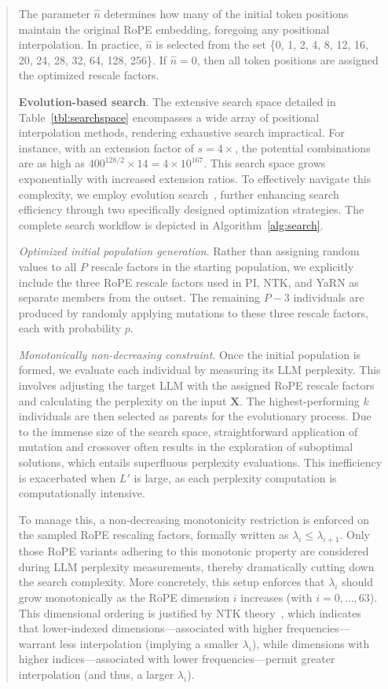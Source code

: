 \begin{abstract}
The parameter $\hat{n}$ determines how many of the initial token positions maintain the original RoPE embedding, foregoing any positional interpolation. In practice, $\hat{n}$ is selected from the set \{0, 1, 2, 4, 8, 12, 16, 20, 24, 28, 32, 64, 128, 256\}. If $\hat{n}=0$, then all token positions are assigned the optimized rescale factors.

\textbf{Evolution-based search}. The extensive search space detailed in Table~\ref{tbl:searchspace} encompasses a wide array of positional interpolation methods, rendering exhaustive search impractical. For instance, with an extension factor of $s=4\times$, the potential combinations are as high as $400^{128/2}\times14=4\times10^{167}$. This search space grows exponentially with increased extension ratios. To effectively navigate this complexity, we employ evolution search~\cite{guo2020single}, further enhancing search efficiency through two specifically designed optimization strategies. The complete search workflow is depicted in Algorithm~\ref{alg:search}.

\textit{Optimized initial population generation}. Rather than assigning random values to all $P$ rescale factors in the starting population, we explicitly include the three RoPE rescale factors used in PI, NTK, and YaRN as separate members from the outset. The remaining $P-3$ individuals are produced by randomly applying mutations to these three rescale factors, each with probability $p$.

\textit{Monotonically non-decreasing constraint}. Once the initial population is formed, we evaluate each individual by measuring its LLM perplexity. This involves adjusting the target LLM with the assigned RoPE rescale factors and calculating the perplexity on the input $\mathbf{X}$. The highest-performing $k$ individuals are then selected as parents for the evolutionary process. Due to the immense size of the search space, straightforward application of mutation and crossover often results in the exploration of suboptimal solutions, which entails superfluous perplexity evaluations. This inefficiency is exacerbated when $L'$ is large, as each perplexity computation is computationally intensive.

To manage this, a non-decreasing monotonicity restriction is enforced on the sampled RoPE rescaling factors, formally written as $\lambda_i \le \lambda_{i+1}$. Only those RoPE variants adhering to this monotonic property are considered during LLM perplexity measurements, thereby dramatically cutting down the search complexity. More concretely, this setup enforces that $\lambda_i$ should grow monotonically as the RoPE dimension $i$ increases (with $i=0, \ldots, 63$). This dimensional ordering is justified by NTK theory~\cite{jacot2018neural,tancik2020fourier,ntk}, which indicates that lower-indexed dimensions—associated with higher frequencies—warrant less interpolation (implying a smaller $\lambda_i$), while dimensions with higher indices—associated with lower frequencies—permit greater interpolation (and thus, a larger $\lambda_i$).


\end{abstract}
